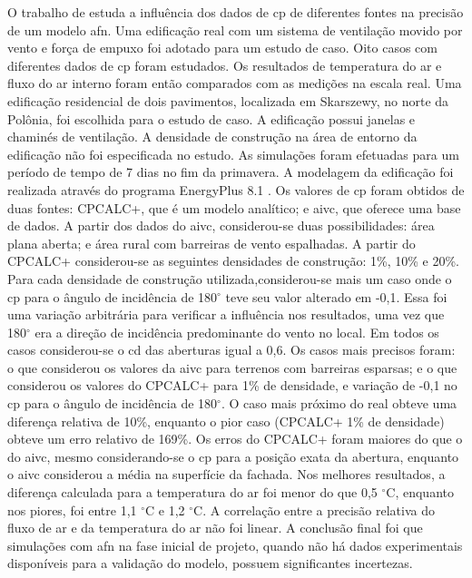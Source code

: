 \documentclass[brazil,hardcopy,openany]{ufscthesis} %
\begin{document}
O trabalho de  estuda a influência dos dados de \acrshort{cp} de diferentes fontes na precisão de um modelo \acrshort{afn}. Uma edificação real com um sistema de ventilação movido por vento e força de empuxo foi adotado para um estudo de caso. Oito casos com diferentes dados de \acrshort{cp} foram estudados. Os resultados de temperatura do ar e fluxo do ar interno foram então comparados com as medições na escala real. Uma edificação residencial de dois pavimentos, localizada em Skarszewy, no norte da Polônia, foi escolhida para o estudo de caso. A edificação possui janelas e chaminés de ventilação. A densidade de construção na área de entorno da edificação não foi especificada no estudo. As simulações foram efetuadas para um período de tempo de 7 dias no fim da primavera. 
A modelagem da edificação foi realizada através do programa EnergyPlus 8.1 \cite{EnergyPlus2015}. Os valores de \acrshort{cp} foram obtidos de duas fontes: CPCALC+, que é um modelo analítico; e \acrshort{aivc}, que oferece uma base de dados. A partir dos dados do \acrshort{aivc}, considerou-se duas possibilidades: área plana aberta; e área rural com barreiras de vento espalhadas. A partir do CPCALC+ considerou-se as seguintes densidades de construção: 1\%, 10\% e 20\%. Para cada densidade de construção utilizada,considerou-se mais um caso onde o \acrshort{cp} para o ângulo de incidência de 180$^{\circ}$ teve seu valor alterado em -0,1. Essa foi uma variação arbitrária para verificar a influência nos resultados, uma vez que 180$^{\circ}$ era a direção de incidência predominante do vento no local. Em todos os casos considerou-se o \acrfull{cd} das aberturas igual a 0,6. 
Os casos mais precisos foram: o que considerou os valores da \acrshort{aivc} para terrenos com barreiras esparsas; e o que considerou os valores do CPCALC+ para 1\% de densidade, e variação de -0,1 no \acrshort{cp} para o ângulo de incidência de 180$^{\circ}$. O caso mais próximo do real obteve uma diferença relativa de 10\%, enquanto o pior caso (CPCALC+ 1\% de densidade) obteve um erro relativo de 169\%. Os erros do CPCALC+ foram maiores do que o do \acrshort{aivc}, mesmo considerando-se o \acrshort{cp} para a posição exata da abertura, enquanto o \acrshort{aivc} considerou a média na superfície da fachada. Nos melhores resultados, a diferença calculada para a temperatura do ar foi menor do que 0,5 $^{\circ}$C, enquanto nos piores, foi entre 1,1 $^{\circ}$C e 1,2 $^{\circ}$C. A correlação entre a precisão relativa do fluxo de ar e da temperatura do ar não foi linear. A conclusão final foi que simulações com \acrshort{afn} na fase inicial de projeto, quando não há dados experimentais disponíveis para a validação do modelo, possuem significantes incertezas.
\end{document}
